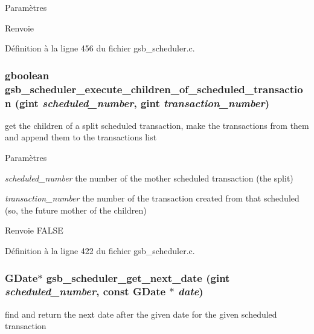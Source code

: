 \begin{DoxyParams}{Paramètres}
\item[{\em }]\end{DoxyParams}
\begin{DoxyReturn}{Renvoie}

\end{DoxyReturn}


Définition à la ligne 456 du fichier gsb\_\-scheduler.c.

\subsubsection[{gsb\_\-scheduler\_\-execute\_\-children\_\-of\_\-scheduled\_\-transaction}]{\setlength{\rightskip}{0pt plus 5cm}gboolean gsb\_\-scheduler\_\-execute\_\-children\_\-of\_\-scheduled\_\-transaction (gint {\em scheduled\_\-number}, \/  gint {\em transaction\_\-number})}\label{gsb__scheduler_8c_abae75f35ff3f5218ffbf2444c0b8f8ed}
get the children of a split scheduled transaction, make the transactions from them and append them to the transactions list


\begin{DoxyParams}{Paramètres}
\item[{\em scheduled\_\-number}]the number of the mother scheduled transaction (the split) \item[{\em transaction\_\-number}]the number of the transaction created from that scheduled (so, the future mother of the children)\end{DoxyParams}
\begin{DoxyReturn}{Renvoie}
FALSE 
\end{DoxyReturn}


Définition à la ligne 422 du fichier gsb\_\-scheduler.c.

\subsubsection[{gsb\_\-scheduler\_\-get\_\-next\_\-date}]{\setlength{\rightskip}{0pt plus 5cm}GDate$\ast$ gsb\_\-scheduler\_\-get\_\-next\_\-date (gint {\em scheduled\_\-number}, \/  const GDate $\ast$ {\em date})}\label{gsb__scheduler_8c_ace6ee5adae18cc4bad4074296e8a5613}
find and return the next date after the given date for the given scheduled transaction


